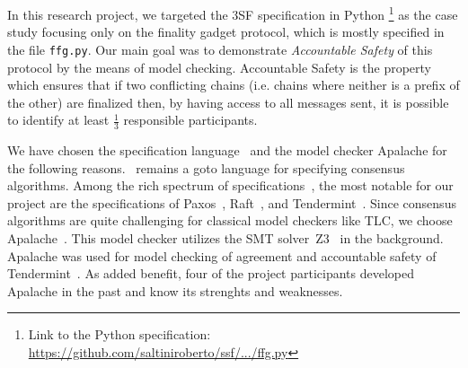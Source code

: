 In this research project, we targeted the 3SF specification in Python \footnote{Link to the Python specification:
\href{https://github.com/saltiniroberto/ssf/blob/ad3ba2c21bc1cd554a870a6e0e4d87040558e129/high_level/common/ffg.py}{https://github.com/saltiniroberto/ssf/.../ffg.py}} as the case study focusing only on the finality gadget protocol, which is mostly specified in the file \texttt{ffg.py}.
Our main goal was to demonstrate 
\emph{Accountable Safety} of this protocol by the means of model checking. 
Accountable Safety is the property which ensures that if two conflicting chains (i.e. chains where neither is a prefix of the other) are finalized then, by having access to all messages sent, it is possible to identify at least $\frac{1}{3}$ responsible participants. 



We have chosen the specification language~\tlap{} and the model checker
Apalache for the following reasons.\ \tlap{} remains a goto language for
specifying consensus algorithms. Among the rich spectrum of
specifications~\cite{tla-examples}, the most notable for our project are the
specifications of Paxos~\cite{lamport2001paxos}, Raft~\cite{Ongaro14}, and
Tendermint~\cite{abs-1807-04938,TendermintSpec2020}. Since consensus algorithms
are quite challenging for classical model checkers like TLC, we choose
Apalache~\cite{Apalache2024,KT19,KonnovKM22}. This model checker utilizes the
SMT solver~Z3~\cite{MouraB08} in the background. Apalache was used for model
checking of agreement and accountable safety of
Tendermint~\cite{TendermintSpec2020}. As added benefit, four of the project
participants developed Apalache in the past and know its strenghts and
weaknesses.

